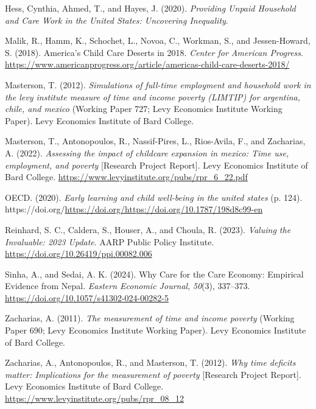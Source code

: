 \documentclass[
  11pt,
]{article}
\newlength{\cslhangindent}
\newenvironment{CSLReferences}[2] %
 {\begin{list}{}{%
  \setlength{\itemindent}{0pt}
  \setlength{\leftmargin}{0pt}
  \setlength{\parsep}{0pt}
  \ifodd #1
   \setlength{\leftmargin}{\cslhangindent}
   \setlength{\itemindent}{-1\cslhangindent}
  \fi
  \setlength{\itemsep}{#2\baselineskip}}}
 {\end{list}}
\begin{document}
\begin{CSLReferences}{1}{0}
Hess, Cynthia, Ahmed, T., and Hayes, J. (2020). \emph{Providing {Unpaid}
{Household} and {Care} {Work} in the {United} {States}: {Uncovering}
{Inequality}}.

Malik, R., Hamm, K., Schochet, L., Novoa, C., Workman, S., and
Jessen-Howard, S. (2018). America's {Child} {Care} {Deserts} in 2018.
\emph{Center for American Progress}.
\url{https://www.americanprogress.org/article/americas-child-care-deserts-2018/}

Masterson, T. (2012). \emph{Simulations of full-time employment and
household work in the levy institute measure of time and income poverty
(LIMTIP) for argentina, chile, and mexico} (Working Paper 727; Levy
Economics Institute Working Paper). Levy Economics Institute of Bard
College.

Masterson, T., Antonopoulos, R., Nassif-Pires, L., Rios-Avila, F., and
Zacharias, A. (2022). \emph{Assessing the impact of childcare expansion
in mexico: Time use, employment, and poverty} {[}Research Project
Report{]}. Levy Economics Institute of Bard College.
\url{https://www.levyinstitute.org/pubs/rpr_6_22.pdf}

OECD. (2020). \emph{Early learning and child well-being in the united
states} (p. 124).
https://doi.org/\url{https://doi.org/https://doi.org/10.1787/198d8c99-en}

Reinhard, S. C., Caldera, S., Houser, A., and Choula, R. (2023).
\emph{Valuing the {Invaluable}: 2023 {Update}}. AARP Public Policy
Institute. \url{https://doi.org/10.26419/ppi.00082.006}

Sinha, A., and Sedai, A. K. (2024). Why {Care} for the {Care} {Economy}:
{Empirical} {Evidence} from {Nepal}. \emph{Eastern Economic Journal},
\emph{50}(3), 337--373. \url{https://doi.org/10.1057/s41302-024-00282-5}

Zacharias, A. (2011). \emph{The measurement of time and income poverty}
(Working Paper 690; Levy Economics Institute Working Paper). Levy
Economics Institute of Bard College.

Zacharias, A., Antonopoulos, R., and Masterson, T. (2012). \emph{Why
time deficits matter: Implications for the measurement of poverty}
{[}Research Project Report{]}. Levy Economics Institute of Bard College.
\url{https://www.levyinstitute.org/pubs/rpr_08_12}


\end{CSLReferences}
\end{document}

